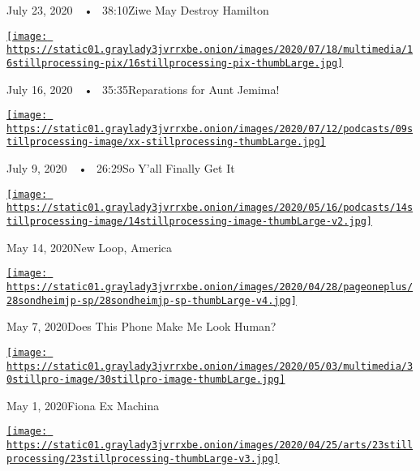 July 23, 2020~~•~ 38:10Ziwe May Destroy Hamilton

\href{https://www.nytimes3xbfgragh.onion/2020/07/16/podcasts/reparations-for-aunt-jemima.html?action=click\&module=audio-series-bar\&region=header\&pgtype=Article}{\texttt{[image: https://static01.graylady3jvrrxbe.onion/images/2020/07/18/multimedia/16stillprocessing-pix/16stillprocessing-pix-thumbLarge.jpg]}}

July 16, 2020~~•~ 35:35Reparations for Aunt Jemima!

\href{https://www.nytimes3xbfgragh.onion/2020/07/09/podcasts/still-processing-black-lives-matter.html?action=click\&module=audio-series-bar\&region=header\&pgtype=Article}{\texttt{[image: https://static01.graylady3jvrrxbe.onion/images/2020/07/12/podcasts/09stillprocessing-image/xx-stillprocessing-thumbLarge.jpg]}}

July 9, 2020~~•~ 26:29So Y'all Finally Get It

\href{https://www.nytimes3xbfgragh.onion/2020/05/14/podcasts/still-processing-westworld-hollywood-utopia-dystopia.html?action=click\&module=audio-series-bar\&region=header\&pgtype=Article}{\texttt{[image: https://static01.graylady3jvrrxbe.onion/images/2020/05/16/podcasts/14stillprocessing-image/14stillprocessing-image-thumbLarge-v2.jpg]}}

May 14, 2020New Loop, America

\href{https://www.nytimes3xbfgragh.onion/2020/05/07/podcasts/still-processing-internet-vulnerability-sondheim-parks-recreation.html?action=click\&module=audio-series-bar\&region=header\&pgtype=Article}{\texttt{[image: https://static01.graylady3jvrrxbe.onion/images/2020/04/28/pageoneplus/28sondheimjp-sp/28sondheimjp-sp-thumbLarge-v4.jpg]}}

May 7, 2020Does This Phone Make Me Look Human?

\href{https://www.nytimes3xbfgragh.onion/2020/04/30/podcasts/still-processing-fiona-apple-fetch-bolt-cutters.html?action=click\&module=audio-series-bar\&region=header\&pgtype=Article}{\texttt{[image: https://static01.graylady3jvrrxbe.onion/images/2020/05/03/multimedia/30stillpro-image/30stillpro-image-thumbLarge.jpg]}}

May 1, 2020Fiona Ex Machina

\href{https://www.nytimes3xbfgragh.onion/2020/04/23/podcasts/still-processing-halle-berry-sharon-stone-catwoman-quarantine.html?action=click\&module=audio-series-bar\&region=header\&pgtype=Article}{\texttt{[image: https://static01.graylady3jvrrxbe.onion/images/2020/04/25/arts/23stillprocessing/23stillprocessing-thumbLarge-v3.jpg]}}

